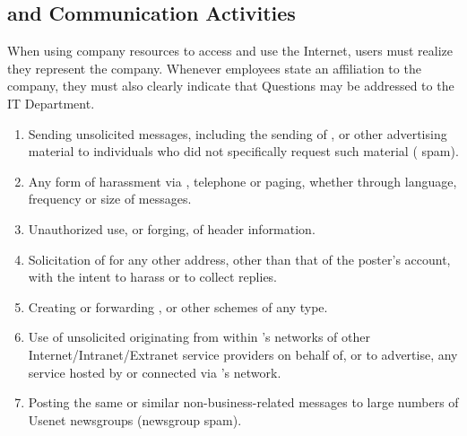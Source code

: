 \subsection{\Email{} and Communication Activities}
When using company resources to access and use the Internet, users must realize they represent the company.  
Whenever employees state an affiliation to the company, they must also clearly indicate that   
Questions may be addressed to the IT Department.
\begin{enumerate}
\item
Sending unsolicited \email{} messages, including the sending of , or other advertising material to individuals who did not specifically request such material (\email{} spam).
\item
Any form of harassment via \email{}, telephone\oxford{} or paging, whether through language, frequency\oxford{} or size of messages.
\item
Unauthorized use, or forging, of \email{} header information.
\item
Solicitation of \email{} for any other \email{} address, other than that of the poster's account, with the intent to harass or to collect replies.
\item
Creating or forwarding , \oxford{} or other  schemes of any type.
\item
Use of unsolicited \email{} originating from within \CompanyName{}'s networks of other Internet/Intranet/Extranet service providers on behalf of, or to advertise, any service hosted by \CompanyName{} or connected via \CompanyName{}'s network. 
\item
Posting the same or similar non-business-related messages to large numbers of Usenet newsgroups (newsgroup spam).
\end{enumerate}

